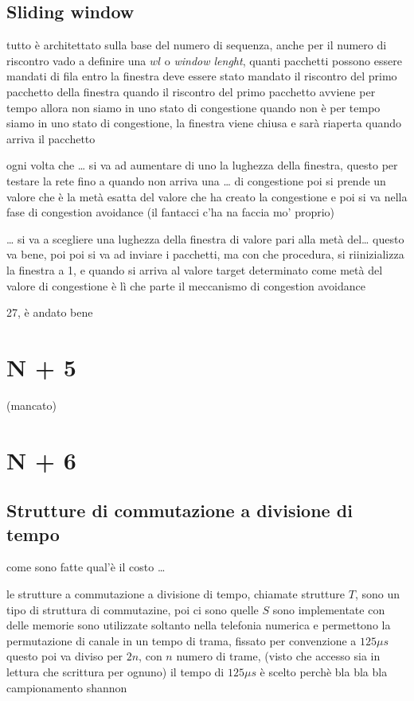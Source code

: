 \documentclass[11pt]{article}
\begin{document}
\subsection{Sliding window}
\label{sec:org774e6a6}
tutto è architettato sulla base del numero di sequenza, anche per il numero di riscontro
vado a definire una \(wl\) o \emph{window lenght}, quanti pacchetti possono essere mandati di fila
entro la finestra deve essere stato mandato il riscontro del primo pacchetto della finestra
quando il riscontro del primo pacchetto avviene per tempo allora non siamo in uno stato di congestione
quando non è per tempo siamo in uno stato di congestione, la finestra viene chiusa e sarà riaperta quando arriva il pacchetto

ogni volta che \ldots{} si va ad aumentare di uno la lughezza della finestra, questo per testare la rete fino a quando non arriva una \ldots{} di congestione
poi si prende un valore che è la metà esatta del valore che ha creato la congestione e poi si va nella fase di congestion avoidance
(il fantacci c'ha na faccia mo' proprio)

\ldots{}
si va a scegliere una lughezza della finestra di valore pari alla metà del\ldots{} questo va bene, poi
poi si va ad inviare i pacchetti, ma con che procedura, si riinizializza la finestra a 1, e quando si arriva al valore target determinato come metà del valore di congestione è lì che parte il meccanismo di congestion avoidance

27, è andato bene

\section{N + 5}
\label{sec:orgf73cfa6}
(mancato)

\section{N + 6}
\label{sec:orgd7f1321}
\subsection{Strutture di commutazione a divisione di tempo}
\label{sec:orgcc39fe2}
come sono fatte
qual'è il costo
\ldots{}

le strutture a commutazione a divisione di tempo, chiamate strutture \(T\), sono un tipo di struttura di commutazine, poi ci sono quelle \(S\)
sono implementate con delle memorie
sono utilizzate soltanto nella telefonia numerica e permettono la permutazione di canale
in un tempo di trama, fissato per convenzione a \(125 \mu s\)
questo poi va diviso per \(2n\), con \(n\) numero di trame, (visto che accesso sia in lettura che scrittura per ognuno)
il tempo di \(125 \mu s\) è scelto perchè bla bla bla campionamento shannon
\end{document}
